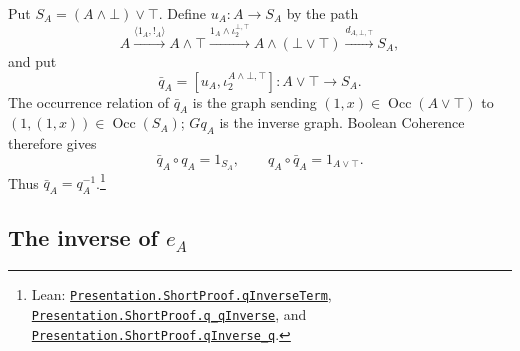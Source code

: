 \documentclass[11pt]{article}
\newcommand{\Occ}{\operatorname{Occ}}
\begin{document}
Put $S_A=(A\wedge\bot)\vee\top$. Define $u_A:A\to S_A$ by
the path
\[
 A\xrightarrow{\langle1_A,!_A\rangle}A\wedge\top
  \xrightarrow{1_A\wedge\iota_2^{\bot,\top}}A\wedge(\bot\vee\top)
  \xrightarrow{d_{A,\bot,\top}}S_A,
\]
and put
\[
 \bar q_A=[u_A,\iota_2^{A\wedge\bot,\top}]:
      A\vee\top\longrightarrow S_A.
\]
The occurrence relation of $\bar q_A$ is the graph sending
$(1,x)\in\Occ(A\vee\top)$ to
$(1,(1,x))\in\Occ(S_A)$; $Gq_A$ is the inverse graph.
Boolean Coherence therefore gives
\[
 \bar q_A\circ q_A=1_{S_A},\qquad
 q_A\circ\bar q_A=1_{A\vee\top}.
\]
Thus $\bar q_A=q_A^{-1}$.\footnote{\raggedright Lean:
\href{https://github.com/flengyel/Dosen-Petric-Maximality/blob/dosen-petric-v25-palomar-v3/DosenPetric/PresentationShortQ.lean\#L17}{\texttt{Presentation.ShortProof.\allowbreak{}qInverseTerm}},
\href{https://github.com/flengyel/Dosen-Petric-Maximality/blob/dosen-petric-v25-palomar-v3/DosenPetric/PresentationShortQ.lean\#L32}{\texttt{Presentation.ShortProof.\allowbreak{}q\_qInverse}}, and
\href{https://github.com/flengyel/Dosen-Petric-Maximality/blob/dosen-petric-v25-palomar-v3/DosenPetric/PresentationShortQ.lean\#L46}{\texttt{Presentation.ShortProof.\allowbreak{}qInverse\_q}}.}

\subsection{The inverse of \texorpdfstring{$e_A$}{eA}}
\end{document}
